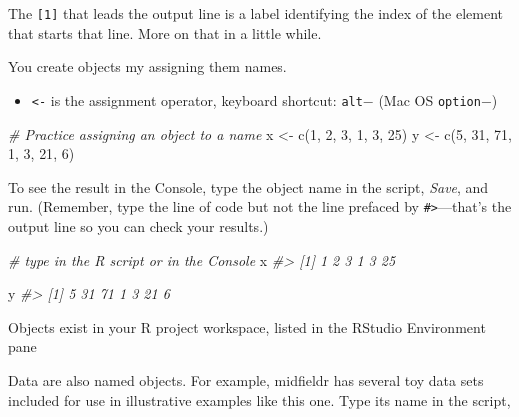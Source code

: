\documentclass[
]{book}
\newenvironment{Shaded}{\begin{snugshade}}{\end{snugshade}}
\newcommand{\CommentTok}[1]{\textcolor[rgb]{0.56,0.35,0.01}{\textit{#1}}}
\newcommand{\DecValTok}[1]{\textcolor[rgb]{0.00,0.00,0.81}{#1}}
\newcommand{\FunctionTok}[1]{\textcolor[rgb]{0.00,0.00,0.00}{#1}}
\newcommand{\NormalTok}[1]{#1}
\newcommand{\OtherTok}[1]{\textcolor[rgb]{0.56,0.35,0.01}{#1}}
\providecommand{\tightlist}{%
  \setlength{\itemsep}{0pt}\setlength{\parskip}{0pt}}
\begin{document}
The \texttt{{[}1{]}} that leads the output line is a label identifying the index of the element that starts that line. More on that in a little while.

You create objects my assigning them names.

\begin{itemize}
\tightlist
\item
  \texttt{\textless{}-} is the assignment operator, keyboard shortcut: \texttt{alt}\(-\) (Mac OS \texttt{option}\(-\))
\end{itemize}

\begin{Shaded}
\begin{Highlighting}[]
\CommentTok{\# Practice assigning an object to a name}
\NormalTok{x }\OtherTok{\textless{}{-}} \FunctionTok{c}\NormalTok{(}\DecValTok{1}\NormalTok{, }\DecValTok{2}\NormalTok{, }\DecValTok{3}\NormalTok{, }\DecValTok{1}\NormalTok{, }\DecValTok{3}\NormalTok{, }\DecValTok{25}\NormalTok{)}
\NormalTok{y }\OtherTok{\textless{}{-}} \FunctionTok{c}\NormalTok{(}\DecValTok{5}\NormalTok{, }\DecValTok{31}\NormalTok{, }\DecValTok{71}\NormalTok{, }\DecValTok{1}\NormalTok{, }\DecValTok{3}\NormalTok{, }\DecValTok{21}\NormalTok{, }\DecValTok{6}\NormalTok{)}
\end{Highlighting}
\end{Shaded}

To see the result in the Console, type the object name in the script, \emph{Save}, and run. (Remember, type the line of code but not the line prefaced by \texttt{\#\textgreater{}}---that's the output line so you can check your results.)

\begin{Shaded}
\begin{Highlighting}[]
\CommentTok{\# type in the R script or in the Console}
\NormalTok{x}
\CommentTok{\#\textgreater{} [1]  1  2  3  1  3 25}

\NormalTok{y}
\CommentTok{\#\textgreater{} [1]  5 31 71  1  3 21  6}
\end{Highlighting}
\end{Shaded}

Objects exist in your R project workspace, listed in the RStudio Environment pane

Data are also named objects. For example, midfieldr has several toy data sets included for use in illustrative examples like this one. Type its name in the script,
\end{document}
